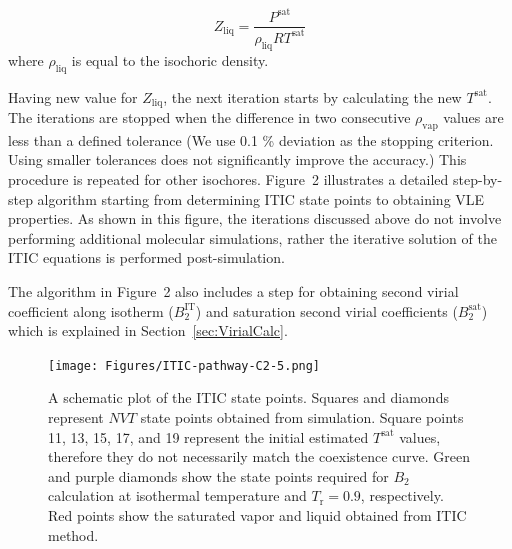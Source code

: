 \documentclass[5p,times]{elsarticle}
\begin{document}
\begin{equation}
{Z_{\mathrm{liq}}} = \frac{P^\mathrm{sat}}{\rho_\mathrm{liq}RT^\mathrm{sat}}  
\label{eqn:zliq}
\end{equation}
where $\rho_\mathrm{liq}$ is equal to the isochoric density.

Having new value for $Z_{\mathrm{liq}}$, the next iteration starts by calculating the new $T^\mathrm{sat}$. The iterations are stopped when the difference in two consecutive $\rho_\mathrm{vap}$ values are less than a defined tolerance (We use 0.1 \% deviation as the stopping criterion. Using smaller tolerances does not significantly improve the accuracy.) This procedure is repeated for other isochores. Figure~2 illustrates a detailed step-by-step algorithm starting from determining ITIC state points to obtaining VLE properties. As shown in this figure, the iterations discussed above do not involve performing additional molecular simulations, rather the iterative solution of the ITIC equations is performed post-simulation. 

The algorithm in Figure~2 also includes a step for obtaining second virial coefficient along isotherm ($B_2^\mathrm{IT}$) and saturation second virial coefficients ($B_2^\mathrm{sat}$) which is explained in Section~\ref{sec:VirialCalc}.
\begin{figure}
\texttt{[image: Figures/ITIC-pathway-C2-5.png]}
\caption{A schematic plot of the ITIC state points. Squares and diamonds represent $NVT$ state points obtained from simulation. Square points 11, 13, 15, 17, and 19 represent the initial estimated $T^\mathrm{sat}$ values, therefore they do not necessarily match the coexistence curve. Green and purple diamonds show the state points required for $B_2$ calculation at isothermal temperature and $T_\mathrm{r}=0.9$, respectively. Red points show the saturated vapor and liquid obtained from ITIC method.}
\label{fig:ITICpathway}
\end{figure}



\end{document}

